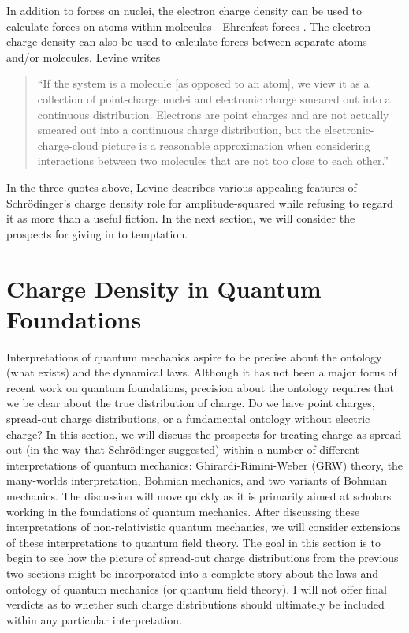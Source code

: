 \documentclass[12pt,onecolumn,secnumarabic,amsmath,amssymb,balancelastpage,nofootinbib]{article}
\begin{document}
In addition to forces on nuclei, the electron charge density can be used to calculate forces on atoms within molecules---Ehrenfest forces \cite{bader1990, bader2005, bader2013}.  The electron charge density can also be used to calculate forces between separate atoms and/or molecules.  Levine \cite[pg.\ 460]{levineQC} writes
\begin{quote}
``If the system is a molecule [as opposed to an atom], we view it as a collection of point-charge nuclei and electronic charge smeared out into a continuous distribution.  Electrons are point charges and are not actually smeared out into a continuous charge distribution, but the electronic-charge-cloud picture is a reasonable approximation when considering interactions between two molecules that are not too close to each other.''
\end{quote}
In the three quotes above, Levine describes various appealing features of Schr\"{o}dinger's charge density role for amplitude-squared while refusing to regard it as more than a useful fiction.  In the next section, we will consider the prospects for giving in to temptation.











\section{Charge Density in Quantum Foundations}\label{QFsection}

Interpretations of quantum mechanics aspire to be precise about the ontology (what exists) and the dynamical laws.  Although it has not been a major focus of recent work on quantum foundations, precision about the ontology requires that we be clear about the true distribution of charge.  Do we have point charges, spread-out charge distributions, or a fundamental ontology without electric charge?  In this section, we will discuss the prospects for treating charge as spread out (in the way that Schr\"{o}dinger suggested) within a number of different interpretations of quantum mechanics: Ghirardi-Rimini-Weber (GRW) theory, the many-worlds interpretation, Bohmian mechanics, and two variants of Bohmian mechanics.  The discussion will move quickly as it is primarily aimed at scholars working in the foundations of quantum mechanics.  After discussing these interpretations of non-relativistic quantum mechanics, we will consider extensions of these interpretations to quantum field theory.  The goal in this section is to begin to see how the picture of spread-out charge distributions from the previous two sections might be incorporated into a complete story about the laws and ontology of quantum mechanics (or quantum field theory).  I will not offer final verdicts as to whether such charge distributions should ultimately be included within any particular interpretation.
\end{document}
